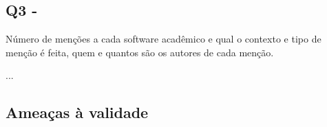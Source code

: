 


\subsection{Q3 - \EstudoUmQuestaoTres} %

Número de menções a cada software acadêmico e qual o contexto e tipo de menção
é feita, quem e quantos são os autores de cada menção.

...



\subsection{Ameaças à validade}

